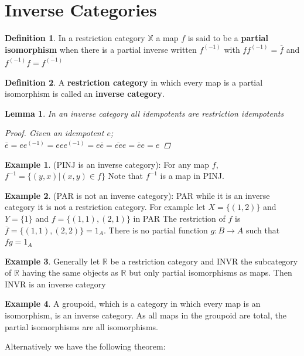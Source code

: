 \documentclass[11pt, oneside]{amsart}
\newtheorem{lemma}{Lemma}
\theoremstyle{definition}
\newtheorem{definition}{Definition}[section]
\theoremstyle{definition}
\newtheorem{exmp}{Example}[section]
\begin{document}
\section{Inverse Categories}
\begin{definition}
 In a restriction category $\mathbb{X}$ a map $f$ is said to be a \textbf{partial isomorphism} when there is a partial inverse written $f^{(-1)}$ with $ff^{(-1)}=\overline{f}$ and $f^{(-1)}f=\overline{f^{(-1)}}$
\end{definition}
\begin{definition}
 A \textbf{restriction category} in which every map is a partial isomorphism is
called an \textbf{inverse category}.
\end{definition}
\begin{lemma}
In an inverse category all idempotents are restriction idempotents
\begin{proof}
Given an idempotent $e$;\\
$\overline{e}=e{e^{(-1)}}=ee{e^{(-1)}}=e\overline{e}=\overline{ee}e=\overline{e}e=e$
\end{proof}
\end{lemma}
\begin{exmp}
(PINJ is an inverse category):  For any map $f$, $f^{-1}= {\{(y,x)|(x,y)\in f\}}$
Note that $f^{-1}$ is a map in PINJ.\\
\end{exmp}
\begin{exmp}
(PAR is not an inverse category): PAR while it is an inverse category it is not a restriction category. For example let $X=\{(1,2)\}$ and $Y=\{1\}$ and $f=\{(1,1), (2,1)\}$ in PAR
The restriction of $f$ is $\overline{f}=\{(1,1),(2,2)\}=1_{A}$. There is no partial function $g:B \to A$ such that $fg=1_{A}$\\
\end{exmp}
\begin{exmp}
Generally  let $\mathbb{R}$ be a restriction category and {INVR} the subcategory of $\mathbb{R}$ having the same objects as $\mathbb{R}$ but only partial isomorphisms as maps. Then {INVR} is an inverse category\\
\end{exmp}
\begin{exmp}
A groupoid, which is a category in which every map is an isomorphism, is
an inverse category. As all maps in the groupoid are total, the partial isomorphisms are all
isomorphisms.
\end{exmp}
Alternatively we have the following theorem:
\end{document}
